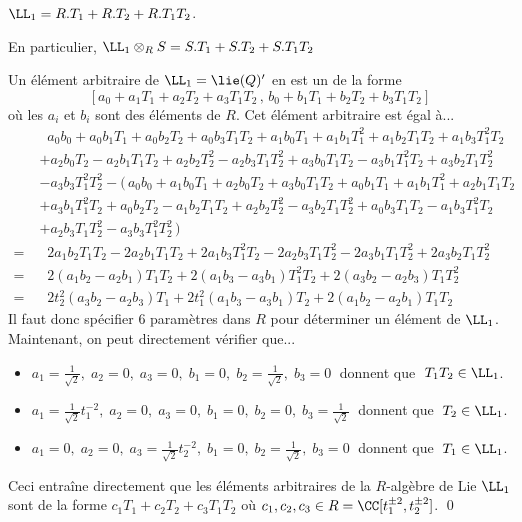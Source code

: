 \begin{annexeLem} $\LL_1 = R.T_1 + R .T_2 + R.T_1T_2$. 

En particulier, $\LL_1 \otimes_R S = S.T_1 + S.T_2 + S.T_1T_2$
\begin{pre} Un élément arbitraire de $\LL_1 = \lie(Q)'$ en est un de la forme
$$ [a_0 + a_1T_1 + a_2T_2 + a_3T_1T_2 \, , \, b_0 + b_1T_1 + b_2T_2 + b_3T_1T_2] $$
où les $a_i$ et $b_i$ sont des éléments de $R$. Cet élément arbitraire est égal à...
\begin{align*}
& \;\; a_0b_0 + a_0b_1T_1 + a_0b_2T_2 + a_0b_3T_1T_2 + a_1b_0T_1 + a_1b_1T_1^2 + a_1b_2T_1T_2 + a_1b_3T_1^2T_2\\
&+ a_2b_0T_2 - a_2b_1T_1T_2 + a_2b_2T_2^2 -a_2b_3T_1T_2^2 + a_3b_0T_1T_2 - a_3b_1T_1^2T_2 +a_3b_2T_1T_2^2\\ &- a_3b_3T_1^2T_2^2 - \big(\, a_0b_0 + a_1b_0T_1 + a_2b_0T_2 + a_3b_0T_1T_2 +a_0b_1T_1 + a_1b_1T_1^2 + a_2b_1T_1T_2\\
& + a_3b_1T_1^2T_2 + a_0b_2T_2 - a_1b_2T_1T_2 + a_2b_2T_2^2 -a_3b_2T_1T_2^2 + a_0b_3T_1T_2 - a_1b_3T_1^2T_2\\
&+ a_2b_3T_1T_2^2 - a_3b_3T_1^2T_2^2 \, \big)\\
= \; & \;\; 2a_1b_2T_1T_2 -2a_2b_1T_1T_2 + 2a_1b_3T_1^2T_2 - 2a_2b_3T_1T_2^2 - 2a_3b_1T_1T_2^2 + 2a_3b_2T_1T_2^2\\
= \; & \;\; 2(a_1b_2-a_2b_1)T_1T_2 + 2(a_1b_3 - a_3b_1)T_1^2T_2 + 2(a_3b_2 - a_2b_3)T_1T_2^2\\
= \; & \;\; 2t_2^2(a_3b_2 - a_2b_3)T_1 + 2t_1^2(a_1b_3 - a_3b_1)T_2 + 2(a_1b_2-a_2b_1)T_1T_2
\end{align*}
Il faut donc spécifier 6 paramètres dans $R$ pour déterminer un élément de $\LL_1$. Maintenant, on peut directement vérifier que...
\begin{itemize}
\item[\textbullet] $a_1 = \frac{1}{\sqrt{2}}, \; a_2 = 0, \; a_3 = 0, \; b_1 = 0, \; b_2 = \frac{1}{\sqrt{2}}, \; b_3 = 0 \;$ donnent que $\; T_1T_2 \in \LL_1$.
\item[\textbullet] $a_1 = \frac{1}{\sqrt{2}}t_1^{-2}, \; a_2 = 0, \; a_3 = 0, \; b_1 = 0, \; b_2 = 0, \; b_3 = \frac{1}{\sqrt{2}} \;$ donnent que $\; T_2 \in \LL_1$.
\item[\textbullet] $a_1 = 0, \; a_2 = 0, \; a_3 = \frac{1}{\sqrt{2}}t_2^{-2}, \; b_1 = 0, \; b_2 = \frac{1}{\sqrt{2}}, \; b_3 = 0 \;$ donnent que $\; T_1 \in \LL_1$.
\end{itemize}

Ceci entraîne directement que les éléments arbitraires de la $R$-algèbre de Lie $\LL_1$ sont de la forme $c_1T_1 + c_2T_2 + c_3T_1T_2$ où $c_1,c_2,c_3 \in R = \CC[t_1^{\pm 2},t_2^{\pm 2}]$.
\qed
\end{pre}
\end{annexeLem}

